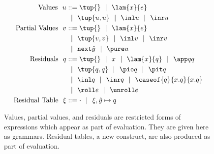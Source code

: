 
\begin{figure}
\begin{abstrsyn}
\[\begin{aligned}
\text{Values}\ \ 
u &::= \tup{}
 \gbar \lam {\var}{e} \\
&\gbar \tup{u, u}
 \gbar \inl u 
 \gbar \inr u \\
\text{Partial Values}\ \ 
v &::= \tup{}
 \gbar \lam {\var}{\expr} \\
&\gbar \tup{v, v}
 \gbar \inl v 
 \gbar \inr v \\
&\gbar \next {\hat y}
 \gbar \pure u \\
\text{Residuals}\ \ 
q &::= \tup{}\gbar\var%
 \gbar \lam {\var}{q} 
 \gbar \app q q \\
&\gbar \tup{q, q} 
 \gbar \pio q 
 \gbar \pit q \\
&\gbar \inl q 
 \gbar \inr q
 \gbar \caseof {q}{\var.q}{\var.q} \\
&\gbar \roll e
 \gbar \unroll e\\
\text{Residual Table}\ \ 
\xi &::= \cdot
 \gbar \xi, {\hat y} \mapsto q \\
\end{aligned}\]
\end{abstrsyn}
\caption{Values, partial values, and residuals are restricted forms of expressions
which appear as part of evaluation.
They are given here as grammars.  
Residual tables, a new construct, are also produced as part of evaluation.}
\label{fig:values}
\end{figure}


